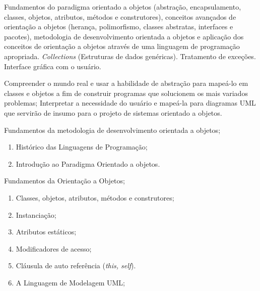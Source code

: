 \begin{pud}
	
	

	\ementa
	Fundamentos do paradigma orientado a objetos (abstração, encapsulamento, classes, objetos, atributos, métodos e construtores), conceitos avançados de orientação a objetos (herança, polimorfismo, classes abstratas, interfaces e pacotes), metodologia de desenvolvimento orientada a objetos e aplicação dos conceitos de orientação a objetos através de uma linguagem de programação apropriada. \textit{Collections} (Estruturas de dados genéricas). Tratamento de exceções. Interface gráfica com o usuário.
	
	\objetivos
	Compreender o mundo real e usar a habilidade de abstração para mapeá-lo em classes e objetos a fim de construir programas que solucionem os mais variados problemas; Interpretar a necessidade do usuário e mapeá-la para diagramas UML que servirão de insumo para o projeto de sistemas orientado a objetos.
	
	\programa
	\begin{description}[itemsep=0em]
		\item[UNIDADE I:] Fundamentos da metodologia de desenvolvimento orientada a objetos; 
	         \begin{enumerate}[itemsep=0em, topsep=0em]
                \item Histórico das Linguagens de Programação;
                \item Introdução ao Paradigma Orientado a objetos.
            \end{enumerate}
            
        \item[UNIDADE II:] Fundamentos da Orientação a Objetos;
	         \begin{enumerate}[itemsep=0em, topsep=0em]
                \item Classes, objetos, atributos, métodos e construtores;
				\item Instanciação;
				\item Atributos estáticos;
				\item Modificadores de acesso;
				\item Cláusula de auto referência (\textit{this, self}).
				\item A Linguagem de Modelagem UML;
            \end{enumerate}
            

\end{description}
\end{pud}
